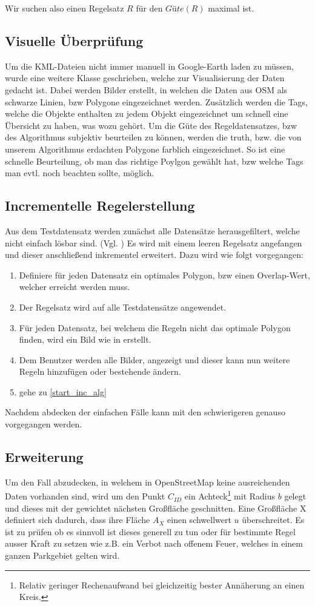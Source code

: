 Wir suchen also einen Regelsatz $R$ für den $Güte(R)$ maximal ist.


\subsection{Visuelle Überprüfung}
\label{sec:visuelle_ueberpruefung}
Um die KML-Dateien nicht immer manuell in Google-Earth laden zu müssen, wurde eine weitere Klasse geschrieben, welche zur Visualisierung der Daten gedacht ist.
Dabei werden Bilder erstellt, in welchen die Daten aus OSM als schwarze Linien, bzw Polygone eingezeichnet werden. Zusätzlich werden die Tags,
welche die Objekte enthalten zu jedem Objekt eingezeichnet um schnell eine Übersicht zu haben, was wozu gehört.
Um die Güte des Regeldatensatzes, bzw des Algorithmus subjektiv beurteilen zu können, werden die truth, bzw. die von unserem Algorithmus erdachten Polygone
farblich eingezeichnet. So ist eine schnelle Beurteilung, ob man das richtige Poylgon gewählt hat, bzw welche Tags man evtl. noch beachten sollte, möglich.

\subsection{Incrementelle Regelerstellung}
Aus dem Testdatensatz werden zunächst alle Datensätze herausgefiltert, welche nicht einfach lösbar sind.
(Vgl. )
Es wird mit einem leeren Regelsatz angefangen und dieser anschließend inkrementel erweitert. Dazu wird wie folgt vorgegangen:
\begin{enumerate}
\item Definiere für jeden Datensatz ein optimales Polygon, bzw einen Overlap-Wert, welcher erreicht werden muss.
\item Der Regelsatz wird auf alle Testdatensätze angewendet. \label{start_inc_alg}
\item Für jeden Datensatz, bei welchem die Regeln nicht das optimale Polygon finden, wird ein Bild wie in  erstellt.
\item Dem Benutzer werden alle Bilder, angezeigt und dieser kann nun weitere Regeln hinzufügen oder bestehende ändern.
\item gehe zu \ref{start_inc_alg}
\end{enumerate}

Nachdem abdecken der einfachen Fälle kann mit den schwierigeren genauso vorgegangen werden.


\subsection{Erweiterung}
Um den Fall abzudecken, in welchem in OpenStreetMap keine ausreichenden Daten vorhanden sind, wird um den Punkt $C_{ID}$ ein
Achteck\footnote{Relativ geringer Rechenaufwand bei gleichzeitig bester Annäherung an einen Kreis.} mit Radius $b$ gelegt
und dieses mit der gewichtet nächsten Großfläche geschnitten.
Eine Großfläche X definiert sich dadurch, dass ihre Fläche $A_X$ einen schwellwert $u$ überschreitet.
Es ist zu prüfen ob es sinnvoll ist dieses generell zu tun oder für bestimmte Regel ausser Kraft zu setzen wie
z.B. ein Verbot nach offenem Feuer, welches in einem ganzen Parkgebiet gelten wird.
